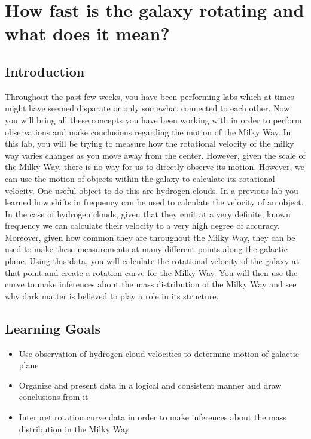\chapter{How fast is the galaxy rotating and what does it mean?}

\section{Introduction}
Throughout the past few weeks, you have been performing labs which at times might have seemed disparate or only somewhat connected to each other. Now, you will bring all these concepts you have been working with in order to perform observations and make conclusions regarding the motion of the Milky Way. In this lab, you will be trying to measure how the rotational velocity of the milky way varies changes as you move away from the center. However, given the scale of the Milky Way, there is no way for us to directly observe its motion. However, we can use the motion of objects within the galaxy to calculate its rotational velocity. One useful object to do this are hydrogen clouds. In a previous lab you learned how shifts in frequency can be used to calculate the velocity of an object. In the case of hydrogen clouds, given that they emit at a very definite, known frequency we can calculate their velocity to a very high degree of accuracy. Moreover, given how common they are throughout the Milky Way, they can be used to make these measurements at many different points along the galactic plane. Using this data, you will calculate the rotational velocity of the galaxy at that point and create a rotation curve for the Milky Way. You will then use the curve to make inferences about the mass distribution of the Milky Way and see why dark matter is believed to play a role in its structure. 

\section{Learning Goals}
\begin{itemize}
	\item Use observation of hydrogen cloud velocities to determine motion of galactic plane
	
	\item Organize and present data in a logical and consistent manner and draw conclusions from it
	
	\item Interpret rotation curve data in order to make inferences about the mass distribution in the Milky Way
\end{itemize}

